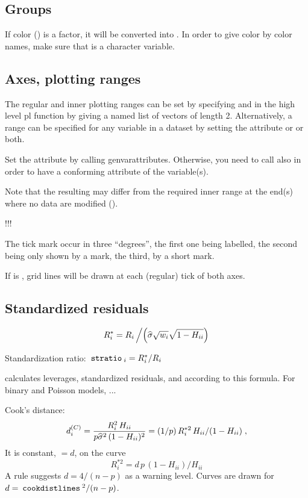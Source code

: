 \documentclass[11pt]{article}\usepackage[]{graphicx}\usepackage[]{color}
\def\wh#1{\widehat{#1}}
\begin{document}
\subsection{Groups}

If color () is a factor, it will be converted into 
.
In order to give color by color names, make sure that  is
a character variable.

\subsection{Axes, plotting ranges}

The regular and inner plotting ranges can be set by specifying
 and  in the high level pl function 
by giving a named list of vectors of length 2.
Alternatively, a range can be specified for any variable in a dataset
by setting the attribute  or
 or both.

Set the  attribute by calling genvarattributes. 
Otherwise, you need to call also  in order to have a conforming
 attribute of the variable(s).

Note that the resulting  may differ from the required 
inner range at the end(s) where no data are modified ().

!!!

The tick mark occur in three ``degrees'', the first one being labelled,
the second being only shown by a mark, the third, by a short mark.

If  is , grid lines will be drawn at each (regular)
tick of both axes.

\subsection{Standardized residuals}

\[
R^*_i=R_i\left/\left(\wh\sigma \sqrt{w_i} \sqrt{1-H_{ii}}\right)\right.
\]

Standardization ratio: 
$\hskip0.5ex\texttt{stratio}\hskip0.5ex_i=R^*_i/R_i$

 calculates leverages, standardized residuals, and 
according to this formula.
For binary and Poisson models, ...

Cook's distance:
\[
  d_i\sups C=\frac{R_i^2\,H_{ii}}{p\wh\sigma^2\,(1-H_{ii})^2}
  =(1/p)\,R_i^{*2}\,H_{ii}/(1-H_{ii})
  \;,
\]
It is constant, $=d$, on the curve
\[
  R_i^{*2} = d\,p\,(1-H_{ii})/H_{ii}
\]
A rule suggests $d=4/(n-p)$ as a warning level.
Curves are drawn for $d=\hskip0.5ex\texttt{cookdistlines}\hskip0.5ex^2/(n-p)$.
\end{document}
